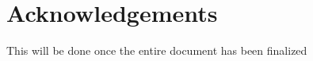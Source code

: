 \chapter*{Acknowledgements}
\label{ack}
\color{green} This will be done once the entire document has been finalized\color{black}